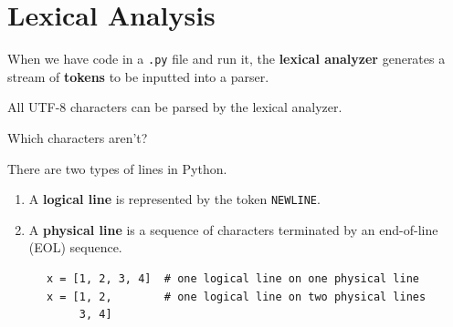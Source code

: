 \section{Lexical Analysis} 

  When we have code in a \texttt{.py} file and run it, the \textbf{lexical analyzer} generates a stream of \textbf{tokens} to be inputted into a parser. 

  \begin{theorem}
    \label{thm:utf-8-in-the-lexical-analyzer}
    All UTF-8 characters can be parsed by the lexical analyzer. 
  \end{theorem}

  \begin{question}
    Which characters aren't? 
  \end{question}

  \begin{definition}
    \label{def:logical-and-physical-lines}
 
    There are two types of lines in Python. 
    \begin{enumerate}
      \item A \textbf{logical line} is represented by the token \texttt{NEWLINE}. 
      \item A \textbf{physical line} is a sequence of characters terminated by an end-of-line (EOL) sequence. 
    \end{enumerate} 
    \begin{lstlisting}
      x = [1, 2, 3, 4]  # one logical line on one physical line 
      x = [1, 2,        # one logical line on two physical lines
           3, 4]
    \end{lstlisting}
  \end{definition} 
